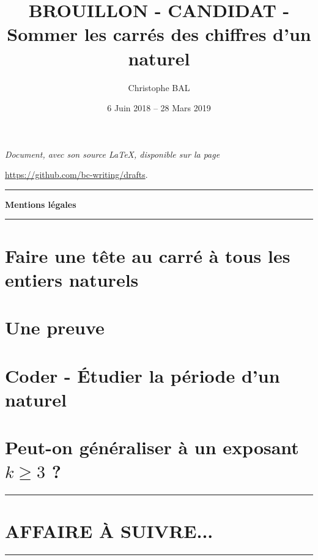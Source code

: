 \documentclass[12pt]{amsart}
\begin{document}
\title{BROUILLON - CANDIDAT - Sommer les carrés des chiffres d'un naturel}
\author{Christophe BAL}
\date{6 Juin 2018 -- 28 Mars 2019}

\maketitle

\begin{center}
	\itshape
	Document, avec son source \LaTeX, disponible sur la page
	
	\url{https://github.com/bc-writing/drafts}.
\end{center}


\bigskip


\begin{center}
	\hrule\vspace{.3em}
	{
		\fontsize{1.35em}{1em}\selectfont
		\textbf{Mentions \og légales \fg}
	}
			
	\vspace{0.45em}
	\doclicenseThis
	\hrule
\end{center}


\bigskip
\setcounter{tocdepth}{1}
\tableofcontents



\section{Faire une tête au carré à tous les entiers naturels}

\label{conjecture}


\section{Une preuve}\label{proof}




\section{Coder - Étudier la \og période \fg{} d'un naturel}




\section{\texorpdfstring{Peut-on généraliser à un exposant $k \geqslant 3$ ?}%
		                {Peut-on généraliser à un exposant k >= 3 ?}}






\bigskip

\hrule

\section{AFFAIRE À SUIVRE...}

\bigskip

\hrule


%
%
\end{document}
